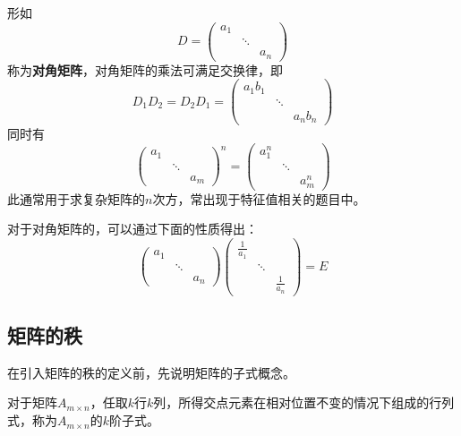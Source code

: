 形如
\[
    D=
    \begin{pmatrix}
        a_1 &        &     \\
            & \ddots &     \\
            &        & a_n
    \end{pmatrix}
\]
称为\textbf{\textsf{对角矩阵}}，对角矩阵的乘法可满足交换律，即
\[
    D_1D_2 = D_2D_1
    =
    \begin{pmatrix}
        a_1b_1 &        &        \\
               & \ddots &        \\
               &        & a_nb_n
    \end{pmatrix}
\]
同时有
\begin{equation}
    \begin{pmatrix}
        a_1 &        &     \\
            & \ddots &     \\
            &        & a_m
    \end{pmatrix}^n
    =
    \begin{pmatrix}
        a_1^n &        &       \\
              & \ddots &       \\
              &        & a_m^n
    \end{pmatrix}
\end{equation}
此通常用于求复杂矩阵的$n$次方，常出现于特征值相关的题目中。

对于对角矩阵的，可以通过下面的性质得出：
\begin{equation}
    \begin{pmatrix}
        a_1 &        &     \\
            & \ddots &     \\
            &        & a_n
    \end{pmatrix}
    \begin{pmatrix}
        \frac{1}{a_1} &        &               \\
                      & \ddots &               \\
                      &        & \frac{1}{a_n}
    \end{pmatrix}
    = E
\end{equation}

\subsection{矩阵的秩}
在引入矩阵的秩的定义前，先说明矩阵的子式概念。
\begin{definition}
    对于矩阵$A_{m\times n}$，任取$k$行$k$列，所得交点元素在相对位置不变的情况下组成的行列式，称为$A_{m \times n}$的$k$阶子式。
\end{definition}

